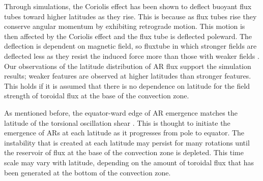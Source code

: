 Through simulations, the Coriolis effect has been shown to deflect buoyant flux tubes toward higher latitudes as they rise. This is because as flux tubes rise they conserve angular momentum by exhibiting retrograde motion. This motion is then affected by the Coriolis effect and the flux tube is deflected poleward. The deflection is dependent on magnetic field, so \gls{fluxtube} in which stronger fields are deflected less as they resist the induced force more than those with weaker fields  \citep[][and references therein]{Fan:2009}. Our observations of the latitude distribution of \gls{AR} flux support the simulation results; weaker features are observed at higher latitudes than stronger features. This holds if it is assumed that there is no dependence on latitude for the field strength of toroidal flux at the base of the convection zone. 

As mentioned before, the equator-ward edge of \gls{AR} emergence matches the latitude of the torsional oscillation shear \citep{Howe:2011}. This is thought to initiate the emergence of \glspl{AR} at each latitude as it progresses from pole to equator. The instability that is created at each latitude may persist for many rotations until the reservoir of flux at the base of the convection zone is depleted. This time scale may vary with latitude, depending on the amount of toroidal flux that has been generated at the bottom of the convection zone. 


